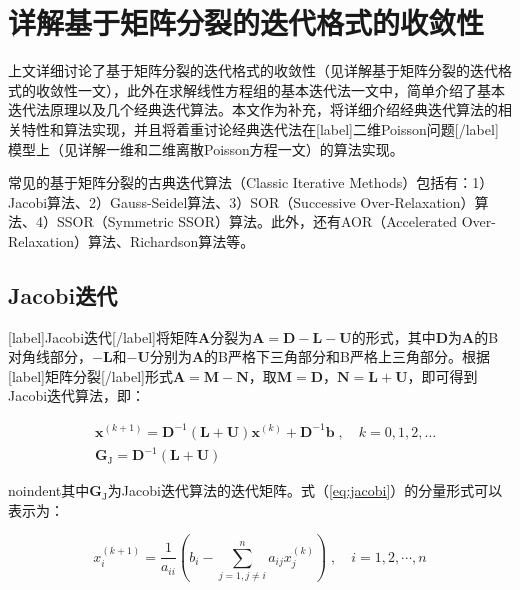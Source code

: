 \documentclass[12pt, UTF8, nofonts]{ctexart}
\begin{document}

\section*{详解基于矩阵分裂的迭代格式的收敛性}

上文详细讨论了基于矩阵分裂的迭代格式的收敛性（见详解基于矩阵分裂的迭代格式的收敛性一文），此外在求解线性方程组的基本迭代法一文中，简单介绍了基本迭代法原理以及几个经典迭代算法。本文作为补充，将详细介绍经典迭代算法的相关特性和算法实现，并且将着重讨论经典迭代法在[label]二维Poisson问题[/label]模型上（见详解一维和二维离散Poisson方程一文）的算法实现。

常见的基于矩阵分裂的古典迭代算法（Classic Iterative Methods）包括有：1）Jacobi算法、2）Gauss-Seidel算法、3）SOR（Successive Over-Relaxation）算法、4）SSOR（Symmetric SSOR）算法。此外，还有AOR（Accelerated Over-Relaxation）算法、Richardson算法等。

\subsection*{Jacobi迭代}

[label]Jacobi迭代[/label]将矩阵$\boldsymbol{A}$分裂为$\boldsymbol{A}=\boldsymbol{D}-\boldsymbol{L}-\boldsymbol{U}$的形式，其中$\boldsymbol{D}$为$\boldsymbol{A}$的B对角线部分，$-\boldsymbol{L}$和$-\boldsymbol{U}$分别为$\boldsymbol{A}$的B严格下三角部分和B严格上三角部分。根据[label]矩阵分裂[/label]形式$\boldsymbol{A}=\boldsymbol{M}-\boldsymbol{N}$，取$\boldsymbol{M}=\boldsymbol{D}$，$\boldsymbol{N}=\boldsymbol{L}+\boldsymbol{U}$，即可得到Jacobi迭代算法，即：

\begin{eqnarray}
    \label{eq:jacobi}
    & \boldsymbol{x}^{(k+1)} = \boldsymbol{D}^{-1}(\boldsymbol{L}+\boldsymbol{U})\boldsymbol{x}^{(k)}+\boldsymbol{D}^{-1}\boldsymbol{b} \;,\quad k=0,1,2,\ldots \\
    & \boldsymbol{G}_{\mathrm{J}}=\boldsymbol{D}^{-1}(\boldsymbol{L}+\boldsymbol{U})
\end{eqnarray}

noindent其中$\boldsymbol{G}_{\mathrm{J}}$为Jacobi迭代算法的迭代矩阵。式（\ref{eq:jacobi}）的分量形式可以表示为：

\begin{equation}
    \label{eq:jacobicomp}
    x_{i}^{(k+1)}=\dfrac{1}{a_{ii}}\left(b_i-\sum_{j=1,j \neq i}^na_{ij}x_j^{(k)}\right) \;,\quad i=1,2,\cdots,n
\end{equation}
\end{document}
